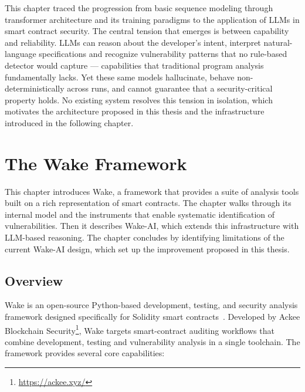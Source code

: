 This chapter traced the progression from basic sequence modeling through transformer architecture and its training paradigms to the application of LLMs in smart contract security. The central tension that emerges is between capability and reliability. LLMs can reason about the developer's intent, interpret natural-language specifications and recognize vulnerability patterns that no rule-based detector would capture --- capabilities that traditional program analysis fundamentally lacks. Yet these same models hallucinate, behave non-deterministically across runs, and cannot guarantee that a security-critical property holds. No existing system resolves this tension in isolation, which motivates the architecture proposed in this thesis and the infrastructure introduced in the following chapter.


\chapter{The Wake Framework}
\label{ch:wake}

This chapter introduces Wake, a framework that provides a suite of analysis tools built on a rich representation of smart contracts. The chapter walks through its internal model and the instruments that enable systematic identification of vulnerabilities. Then it describes Wake-AI, which extends this infrastructure with LLM-based reasoning. The chapter concludes by identifying limitations of the current Wake-AI design, which set up the improvement proposed in this thesis.

\section{Overview}
\label{sec:wake-overview}

Wake is an open-source Python-based development, testing, and security analysis framework designed specifically for Solidity smart contracts~\cite{wake-docs}. Developed by Ackee Blockchain Security\footnote{\url{https://ackee.xyz/}}, Wake targets smart-contract auditing workflows that combine development, testing and vulnerability analysis in a single toolchain. The framework provides several core capabilities:


